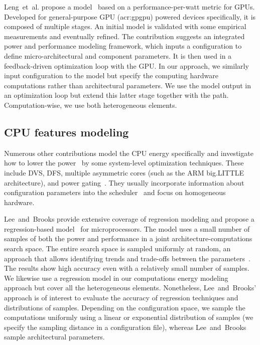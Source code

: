 Leng~et~al. propose a model~\citep{leng2013gpuwattch} based on a performance-per-watt metric for GPUs. Developed for general-purpose GPU (\Gls{acr:gpgpu}) powered devices specifically, it is composed of multiple stages. An initial model is validated with some empirical measurements and eventually refined.  The contribution suggests an integrated power and performance modeling framework, which inputs a configuration to define micro-architectural and component parameters. It is then used in a feedback-driven optimization loop with the GPU. In our approach, we similarly input configuration to the model but specify the computing hardware computations rather than architectural parameters. We use the model output in an optimization loop but extend this latter stage together with the path. Computation-wise, we use both heterogeneous elements.

\subsection{CPU features modeling}
\label{sec:soa-cpu}

Numerous other contributions model the CPU energy specifically and investigate how to lower the power~\citep{hong1999power, luo2001battery, chowdhury2005static} by some system-level optimization techniques. These include DVS, DFS, multiple asymmetric cores (such as the ARM big.LITTLE architecture), and power gating~\citep{walker2017accurate}. They usually incorporate information about configuration parameters into the scheduler~\citep{seewald2019coarse} and focus on homogeneous hardware. 

Lee~and~Brooks provide extensive coverage of regression modeling and propose a regression-based model~\citep{lee2006statistically,lee2006accurate} for microprocessors. The model uses a small number of samples of both the power and performance in a joint architecture-computations search space. The entire search space is sampled uniformly at random, an approach that allows identifying trends and trade-offs between the parameters~\citep{lee2006accurate}. The results show high accuracy even with a relatively small number of samples. We likewise use a regression model in our computations energy modeling approach but cover all the heterogeneous elements. Nonetheless, Lee~and~Brooks' approach is of interest to evaluate the accuracy of regression techniques and distributions of samples. Depending on the configuration space, we sample the computations uniformly using a linear or exponential distribution of samples (we specify the sampling distance in a configuration file), whereas Lee~and~Brooks sample architectural parameters.

